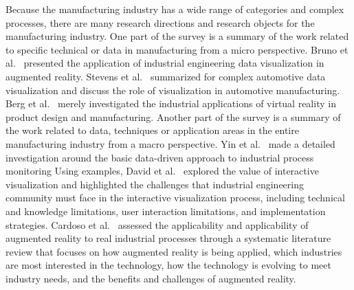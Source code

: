 \documentclass[a4paper,fleqn]{cas-dc}
\begin{document}
Because the manufacturing industry has a wide range of categories and complex processes, there are many research directions and research objects for the manufacturing industry.
One part of the survey is a summary of the work related to specific technical or data in manufacturing from a micro perspective. 
Bruno et al.~\cite{Bruno2006} presented the application of industrial engineering data visualization in augmented reality.
Stevens et al.~\cite{Schlereth2007} summarized for complex automotive data visualization and discuss the role of visualization in automotive manufacturing.
Berg et al.~\cite{Berg2017} merely investigated the industrial applications of virtual reality in product design and manufacturing.
Another part of the survey is a summary of the work related to data, techniques or application areas in the entire manufacturing industry from a macro perspective.
Yin et al.~\cite{Yin2014} made a detailed investigation around the basic data-driven approach to industrial process monitoring
Using examples, David et al.~\cite{FontVivanco2019} explored the value of interactive visualization and highlighted the challenges that industrial engineering community must face in the interactive visualization process, including technical and knowledge limitations, user interaction limitations, and implementation strategies. 
Cardoso et al.~\cite{DeSouzaCardoso2020} assessed the applicability and applicability of augmented reality to real industrial processes through a systematic literature review that focuses on how augmented reality is being applied, which industries are most interested in the technology, how the technology is evolving to meet industry needs, and the benefits and challenges of augmented reality.  
\end{document}
